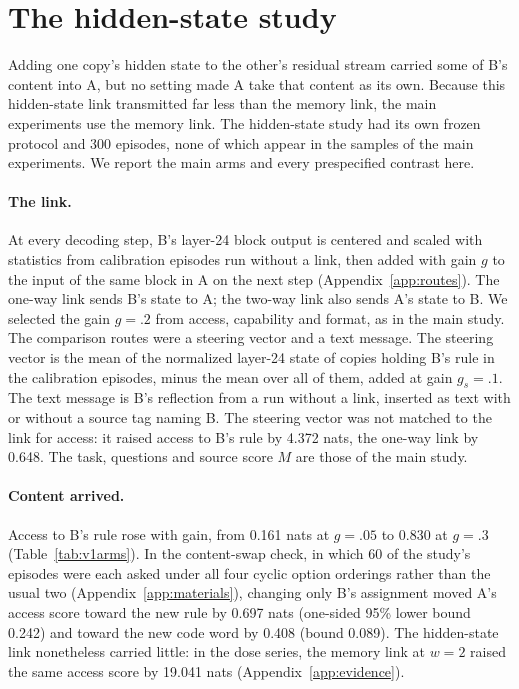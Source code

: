 \section{The hidden-state study}
\label{app:v1}

Adding one copy's hidden state to the other's residual stream carried
some of B's content into A, but no setting made A take that content as
its own. Because this hidden-state link transmitted far less than the
memory link, the main experiments use the memory link. The hidden-state
study had its own frozen protocol and 300 episodes, none of which appear
in the samples of the main experiments. We report the main arms and
every prespecified contrast here.

\paragraph{The link.}
At every decoding step, B's layer-24 block output is centered and scaled
with statistics from calibration episodes run without a link, then added
with gain $g$ to the input of the same block in A on the next step
(Appendix~\ref{app:routes}). The one-way link sends B's state to A; the
two-way link also sends A's state to B. We selected the gain $g=.2$ from
access, capability and format, as in the main study. The comparison
routes were a steering vector and a text message. The steering vector is
the mean of the normalized layer-24 state of copies holding B's rule
in the calibration episodes, minus the mean over all of them, added at
gain $g_s=.1$. The text message is B's reflection from a run without a
link, inserted as text with or without a source tag naming B. The
steering vector was not matched to the link for access: it raised
access to B's rule by 4.372 nats, the one-way link by 0.648. The
task, questions and source score $M$ are those of the main study.

\paragraph{Content arrived.}
Access to B's rule rose with gain, from 0.161 nats at $g=.05$ to
0.830 at $g=.3$ (Table~\ref{tab:v1arms}). In the content-swap check,
in which 60 of the study's episodes were each asked under all four
cyclic option orderings rather than the usual two
(Appendix~\ref{app:materials}), changing only B's assignment moved A's
access score toward the new rule by 0.697 nats (one-sided 95\% lower
bound 0.242) and toward the new code word by 0.408 (bound 0.089). The
hidden-state link nonetheless carried little: in the dose series, the
memory link at $w=2$ raised the same access score by 19.041 nats
(Appendix~\ref{app:evidence}).

